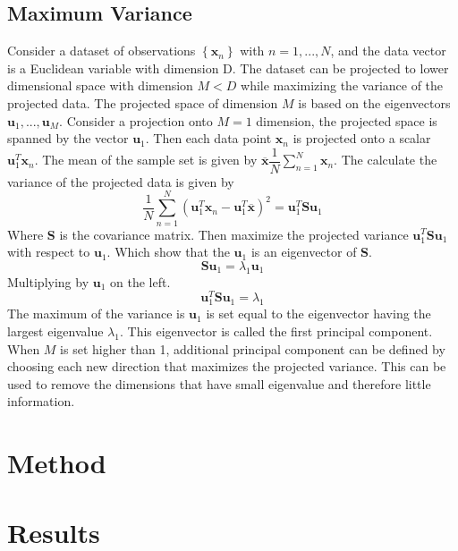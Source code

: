 \subsection{Maximum Variance}
Consider a dataset of observations $ \left\lbrace \mathbf{x}_n \right\rbrace $ with $ n = 1,...,N $, and the data vector is a Euclidean variable with dimension D. 
The dataset can be projected to lower dimensional space with dimension $ M<D $ 	while maximizing the variance of the projected data. 
The projected space of dimension $ M $ is based on the eigenvectors $ \mathbf{u}_1, ..., \mathbf{u}_M $.
Consider a projection onto $ M=1 $ dimension, the projected space is spanned by the vector $ \mathbf{u}_1 $. 
Then each data point $ \mathbf{x}_n $ is projected onto a scalar $ \mathbf{u}_1^T \mathbf{x}_n $. The mean of the sample set is given by $ \overline{\mathbf{x}} \dfrac{1}{N}\sum_{n=1}^{N} \mathbf{x}_n $.
The calculate the variance of the projected data is given by
\begin{equation}
\dfrac{1}{N}\sum_{n=1}^{N}\left(\mathbf{u}_1^T \mathbf{x}_n-\mathbf{u}_1^T \overline{\mathbf{x}} \right)^2 = \mathbf{u}_1^T \mathbf{S} \mathbf{u}_1
\end{equation}
Where \textbf{S} is the covariance matrix. 
Then maximize the projected variance $ \mathbf{u}_1^T \mathbf{S} \mathbf{u}_1 $ with respect to $ \mathbf{u}_1 $.
Which show that the $ \mathbf{u}_1 $ is an eigenvector of \textbf{S}.
\begin{equation}
\mathbf{S}\mathbf{u}_1 = \lambda_1 \mathbf{u}_1
\end{equation}
Multiplying by $ \mathbf{u}_1 $ on the left.
\begin{equation}
\mathbf{u}_1^T \mathbf{S}\mathbf{u}_1 = \lambda_1
\end{equation}
The maximum of the variance is $ \mathbf{u}_1 $ is set equal to the eigenvector having the largest eigenvalue $ \lambda_1 $.
This eigenvector is called the first principal component. 
When $ M $ is set higher than 1, additional principal component can be defined by choosing each new direction that maximizes the projected variance.
This can be used to remove the dimensions that have small eigenvalue and therefore little information.         


\section{Method}

\section{Results}

